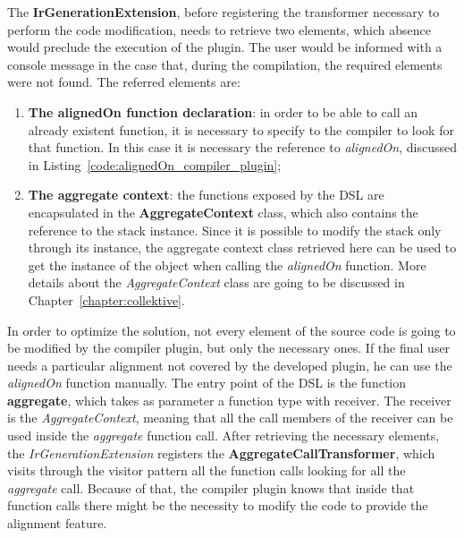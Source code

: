 The \textbf{IrGenerationExtension}, before registering the transformer necessary to perform the code modification, needs to retrieve two elements, which absence would preclude the execution of the plugin. The user would be informed with a console message in the case that, during the compilation, the required elements were not found.\newline
The referred elements are:
\begin{enumerate}
    \item \textbf{The alignedOn function declaration}: in order to be able to call an already existent function, it is necessary to specify to the compiler to look for that function. In this case it is necessary the reference to \textit{alignedOn}, discussed in Listing~\ref{code:alignedOn_compiler_plugin};
    \item \textbf{The aggregate context}: the functions exposed by the DSL are encapsulated in the \textbf{AggregateContext} class, which also contains the reference to the stack instance. Since it is possible to modify the stack only through its instance, the aggregate context class retrieved here can be used to get the instance of the object when calling the \textit{alignedOn} function. More details about the \textit{AggregateContext} class are going to be discussed in Chapter~\ref{chapter:collektive}.
\end{enumerate}

In order to optimize the solution, not every element of the source code is going to be modified by the compiler plugin, but only the necessary ones. If the final user needs a particular alignment not covered by the developed plugin, he can use the \textit{alignedOn} function manually.\newline
The entry point of the DSL is the function \textbf{aggregate}, which takes as parameter a function type with receiver. The receiver is the \textit{AggregateContext}, meaning that all the call members of the receiver can be used inside the \textit{aggregate} function call.\newline
After retrieving the necessary elements, the \textit{IrGenerationExtension} registers the \textbf{AggregateCallTransformer}, which visits through the visitor pattern all the function calls looking for all the \textit{aggregate} call. Because of that, the compiler plugin knows that inside that function calls there might be the necessity to modify the code to provide the alignment feature.

